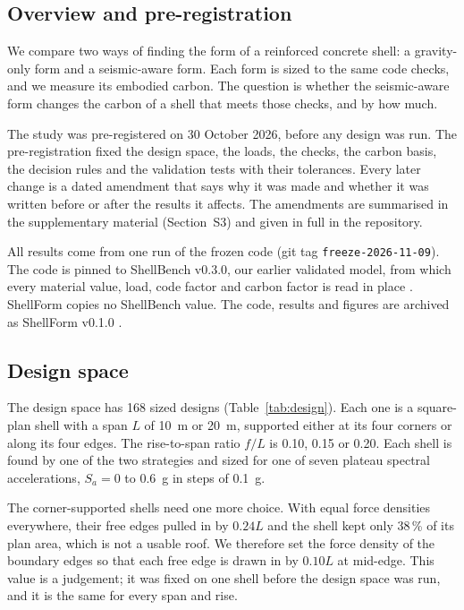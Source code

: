 \documentclass[preprint,12pt]{elsarticle}
\begin{document}
\subsection{Overview and pre-registration}

We compare two ways of finding the form of a reinforced concrete shell: a gravity-only form and a seismic-aware form. Each form is sized to the same code checks, and we measure its embodied carbon. The question is whether the seismic-aware form changes the carbon of a shell that meets those checks, and by how much.

The study was pre-registered on 30 October 2026, before any design was run. The pre-registration fixed the design space, the loads, the checks, the carbon basis, the decision rules and the validation tests with their tolerances. Every later change is a dated amendment that says why it was made and whether it was written before or after the results it affects. The amendments are summarised in the supplementary material (Section~S3) and given in full in the repository.

All results come from one run of the frozen code (git tag \texttt{freeze-2026-11-09}). The code is pinned to ShellBench v0.3.0, our earlier validated model, from which every material value, load, code factor and carbon factor is read in place \cite{ShellBench}. ShellForm copies no ShellBench value. The code, results and figures are archived as ShellForm v0.1.0 \cite{ShellForm}.

\subsection{Design space}

The design space has 168 sized designs (Table~\ref{tab:design}). Each one is a square-plan shell with a span $L$ of 10~m or 20~m, supported either at its four corners or along its four edges. The rise-to-span ratio $f/L$ is 0.10, 0.15 or 0.20. Each shell is found by one of the two strategies and sized for one of seven plateau spectral accelerations, $S_a = 0$ to 0.6~g in steps of 0.1~g.

The corner-supported shells need one more choice. With equal force densities everywhere, their free edges pulled in by $0.24L$ and the shell kept only 38\,\% of its plan area, which is not a usable roof. We therefore set the force density of the boundary edges so that each free edge is drawn in by $0.10L$ at mid-edge. This value is a judgement; it was fixed on one shell before the design space was run, and it is the same for every span and rise.
\end{document}
